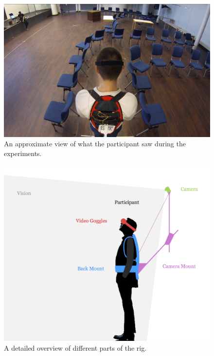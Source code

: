 \documentclass[runningheads,a4paper,oribibl]{llncs}
\begin{document}
\begin{figure}
   \centering
   \includegraphics[width=\textwidth]{ExternalMaterial/3Pview}

   \caption{An approximate view of what the participant saw during the experiments. \label{fig:3Pview}}
\end{figure}



\begin{figure}
   \centering
   \includegraphics[width=\textwidth]{ExternalMaterial/Rig}
   \caption{A detailed overview of different parts of the rig. \label{fig:RigDesign}}
\end{figure}
\end{document}
